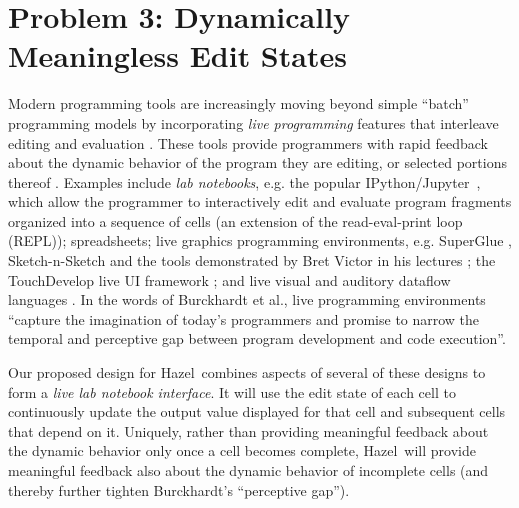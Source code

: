 \documentclass[letterpaper,USenglish]{lipics-v2016}
\newcommand{\Hazel}[0]{\textsf{Hazel}}
\newcommand{\HazelEnv}[0]{\Hazel}
\begin{document}
\section{Problem 3: Dynamically Meaningless Edit States} Modern programming
tools are increasingly moving beyond simple ``batch'' programming models by
incorporating \emph{live programming} features that interleave editing and
evaluation \cite{DBLP:conf/icse/Tanimoto13,DBLP:journals/vlc/Tanimoto90,McDirmid:2007:LUL:1297105.1297073}. These tools provide programmers with rapid feedback about the
dynamic behavior of the program they are editing, or selected portions thereof \cite{McDirmid:2013:ULP:2509578.2509585}. Examples include \emph{lab notebooks},
e.g. the popular IPython/Jupyter~\cite{Perez:2007:ISI:1251563.1251831}, which allow the
programmer to interactively edit and evaluate program fragments organized into a
sequence of cells (an extension of the read-eval-print loop (REPL)); spreadsheets; {live graphics programming environments}, e.g. SuperGlue \cite{McDirmid:2007:LUL:1297105.1297073}, Sketch-n-Sketch \cite{DBLP:conf/pldi/ChughHSA16,DBLP:conf/icse/Chugh25} and the tools demonstrated by Bret Victor in his lectures \cite{victor2012inventing}; the TouchDevelop live UI framework \cite{burckhardt2013s}; and live visual and auditory dataflow languages \cite{DBLP:conf/vl/BurnettAW98}. In the words of Burckhardt et al.\cite{burckhardt2013s}, live programming environments 
``capture the imagination of today's programmers and promise to narrow the temporal and perceptive gap 
between program development and code execution''. 

Our proposed design for \HazelEnv~combines aspects of several of these designs to form a \emph{live lab notebook interface}. 
It will use the edit state of each cell to continuously update the output
value displayed for that cell and subsequent cells that depend on
it. Uniquely, rather than providing meaningful feedback about the dynamic
behavior only once a cell becomes complete, \HazelEnv~will provide meaningful feedback also
about the dynamic behavior of incomplete cells (and thereby further tighten Burckhardt's ``perceptive gap'').
\end{document}

